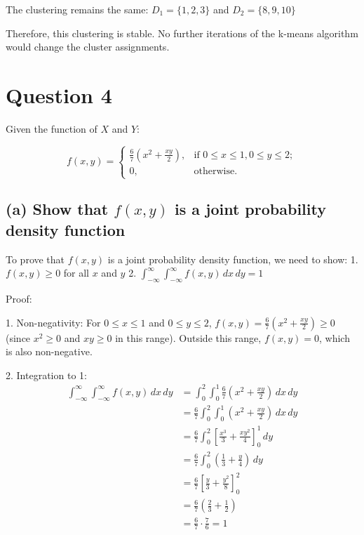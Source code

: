 \documentclass{article}
\begin{document}
The clustering remains the same: $D_1 = \{1, 2, 3\}$ and $D_2 = \{8, 9, 10\}$

Therefore, this clustering is stable. No further iterations of the k-means algorithm would change the cluster assignments.

\section*{Question 4}

Given the function of $X$ and $Y$:

\[
f(x,y) = 
\begin{cases} 
\frac{6}{7}(x^2 + \frac{xy}{2}), & \text{if } 0 \leq x \leq 1, 0 \leq y \leq 2; \\
0, & \text{otherwise}.
\end{cases}
\]

\subsection*{(a) Show that $f(x,y)$ is a joint probability density function}

To prove that $f(x,y)$ is a joint probability density function, we need to show:
1. $f(x,y) \geq 0$ for all $x$ and $y$
2. $\int_{-\infty}^{\infty}\int_{-\infty}^{\infty} f(x,y) \, dx \, dy = 1$

Proof:

1. Non-negativity: 
   For $0 \leq x \leq 1$ and $0 \leq y \leq 2$, $f(x,y) = \frac{6}{7}(x^2 + \frac{xy}{2}) \geq 0$ 
   (since $x^2 \geq 0$ and $xy \geq 0$ in this range).
   Outside this range, $f(x,y) = 0$, which is also non-negative.

2. Integration to 1:
\begin{align*}
\int_{-\infty}^{\infty}\int_{-\infty}^{\infty} f(x,y) \, dx \, dy 
&= \int_{0}^{2}\int_{0}^{1} \frac{6}{7}(x^2 + \frac{xy}{2}) \, dx \, dy \\
&= \frac{6}{7}\int_{0}^{2}\int_{0}^{1} (x^2 + \frac{xy}{2}) \, dx \, dy \\
&= \frac{6}{7}\int_{0}^{2} [\frac{x^3}{3} + \frac{xy^2}{4}]_{0}^{1} \, dy \\
&= \frac{6}{7}\int_{0}^{2} (\frac{1}{3} + \frac{y}{4}) \, dy \\
&= \frac{6}{7}[\frac{y}{3} + \frac{y^2}{8}]_{0}^{2} \\
&= \frac{6}{7}(\frac{2}{3} + \frac{1}{2}) \\
&= \frac{6}{7} \cdot \frac{7}{6} = 1
\end{align*}
\end{document}
